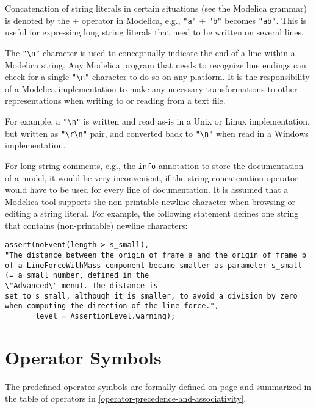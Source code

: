 Concatenation of string literals in certain situations (see the Modelica grammar) is denoted by the + operator in Modelica, e.g., \lstinline!"a"! + \lstinline!"b"! becomes \lstinline!"ab"!.
This is useful for expressing long string literals that need to be written on several lines.

The \lstinline!"\n"! character is used to conceptually indicate the end of a line within a Modelica string.
Any Modelica program that needs to recognize line endings can check for a single \lstinline!"\n"! character to do so on any platform.
It is the responsibility of a Modelica implementation to make any necessary transformations to other representations when writing to or reading from a text file.

\begin{nonnormative}
For example, a \lstinline!"\n"! is written and read as-is in a Unix or Linux implementation, but written as \lstinline!"\r\n"! pair, and converted back to \lstinline!"\n"! when read in a Windows implementation.
\end{nonnormative}

\begin{nonnormative}
For long string comments, e.g., the \lstinline!info! annotation to store the documentation of a model, it would be very inconvenient, if the string concatenation operator would have to be used for every line of documentation.
It is assumed that a Modelica tool supports the non-printable newline character when browsing or editing a string literal.
For example, the following statement defines one string that contains (non-printable) newline characters:
\begin{lstlisting}[language=modelica]
assert(noEvent(length > s_small),
"The distance between the origin of frame_a and the origin of frame_b
of a LineForceWithMass component became smaller as parameter s_small
(= a small number, defined in the
\"Advanced\" menu). The distance is
set to s_small, although it is smaller, to avoid a division by zero
when computing the direction of the line force.",
       level = AssertionLevel.warning);
\end{lstlisting}
\end{nonnormative}


\section{Operator Symbols}\label{operator-symbols}

The predefined operator symbols are formally defined on page \pageref{lexical-conventions} and summarized in the table of operators in \cref{operator-precedence-and-associativity}.
